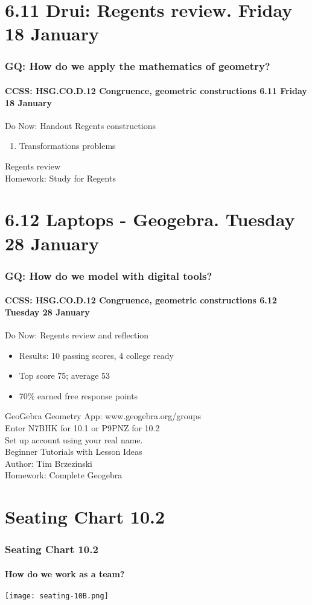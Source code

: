 \documentclass{beamer}
\begin{document}
\section{6.11 Drui: Regents review. Friday 18 January}
  \frame
  {
    \frametitle{GQ: How do we apply the mathematics of geometry?}
    \framesubtitle{CCSS: HSG.CO.D.12 Congruence, geometric constructions  \alert{6.11 Friday 18 January}}

    \begin{block}{Do Now: Handout Regents constructions}
      \begin{enumerate}
        \item Transformations problems
      \end{enumerate}
    \end{block}
    Regents review\\[0.5cm]
    Homework: Study for Regents
  }


  \section{6.12 Laptops - Geogebra. Tuesday 28 January}
    \frame
    {
      \frametitle{GQ: How do we model with digital tools?}
      \framesubtitle{CCSS: HSG.CO.D.12 Congruence, geometric constructions  \alert{6.12 Tuesday 28 January}}

      \begin{block}{Do Now: Regents review and reflection}
        \begin{itemize}
          \item Results: 10 passing scores, 4 college ready
          \item Top score 75; average 53
          \item 70\% earned free response points
        \end{itemize}
      \end{block}
      GeoGebra Geometry App: www.geogebra.org/groups\\
      Enter \alert{N7BHK} for 10.1 or \alert{P9PNZ} for 10.2\\
      Set up account using your real name.\\
      Beginner Tutorials with Lesson Ideas\\
      Author: Tim Brzezinski\\[0.5cm]
      Homework: Complete Geogebra
    }

    \section{Seating Chart 10.2}
      \frame
      {
        \frametitle{Seating Chart 10.2}
        \framesubtitle{How do we work as a team?}

        \texttt{[image: seating-10B.png]}

      }
\end{document}
